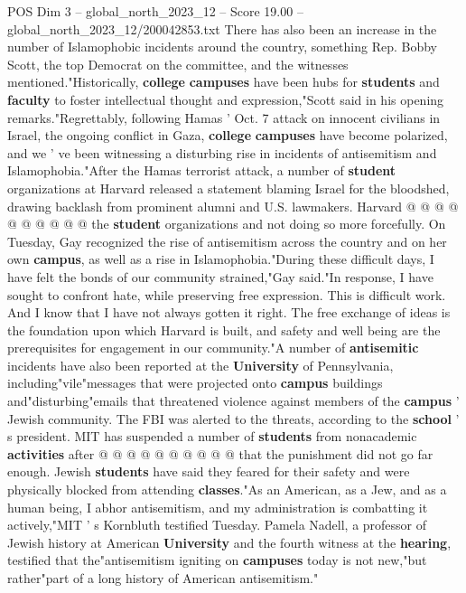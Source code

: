 \begin{textsample}{POS Dim 3 – global\_north\_2023\_12 – Score 19.00 – global\_north\_2023\_12/200042853.txt}
There has also been an increase in the number of Islamophobic incidents around the country, something Rep.
Bobby Scott, the top Democrat on the committee, and the witnesses mentioned."Historically, \textbf{college} \textbf{campuses} have been hubs for \textbf{students} and \textbf{faculty} to foster intellectual thought and expression,"Scott said in his opening remarks."Regrettably, following Hamas ' Oct. 7 attack on innocent civilians in Israel, the ongoing conflict in Gaza, \textbf{college} \textbf{campuses} have become polarized, and we ' ve been witnessing a disturbing rise in incidents of antisemitism and Islamophobia."After the Hamas terrorist attack, a number of \textbf{student} organizations at Harvard released a statement blaming Israel for the bloodshed, drawing backlash from prominent alumni and U.S. lawmakers.
Harvard @ @ @ @ @ @ @ @ @ @ the \textbf{student} organizations and not doing so more forcefully.
On Tuesday, Gay recognized the rise of antisemitism across the country and on her own \textbf{campus}, as well as a rise in Islamophobia."During these difficult days, I have felt the bonds of our community strained,"Gay said."In response, I have sought to confront hate, while preserving free expression.
This is difficult work.
And I know that I have not always gotten it right.
The free exchange of ideas is the foundation upon which Harvard is built, and safety and well being are the prerequisites for engagement in our community."A number of \textbf{antisemitic} incidents have also been reported at the \textbf{University} of Pennsylvania, including"vile"messages that were projected onto \textbf{campus} buildings and"disturbing"emails that threatened violence against members of the \textbf{campus} ' Jewish community.
The FBI was alerted to the threats, according to the \textbf{school} ' s president.
MIT has suspended a number of \textbf{students} from nonacademic \textbf{activities} after @ @ @ @ @ @ @ @ @ @ that the punishment did not go far enough.
Jewish \textbf{students} have said they feared for their safety and were physically blocked from attending \textbf{classes}."As an American, as a Jew, and as a human being, I abhor antisemitism, and my administration is combatting it actively,"MIT ' s Kornbluth testified Tuesday.
Pamela Nadell, a professor of Jewish history at American \textbf{University} and the fourth witness at the \textbf{hearing}, testified that the"antisemitism igniting on \textbf{campuses} today is not new,"but rather"part of a long history of American antisemitism."

\end{textsample}
